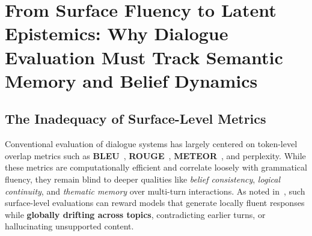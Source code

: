 \documentclass[11pt]{article}
\begin{document}

\section{From Surface Fluency to Latent Epistemics: Why Dialogue Evaluation Must Track Semantic Memory and Belief Dynamics}

\subsection{The Inadequacy of Surface-Level Metrics}

Conventional evaluation of dialogue systems has largely centered on token-level overlap metrics such as \textbf{BLEU}~\cite{papineni2002bleu}, \textbf{ROUGE}~\cite{lin2004rouge}, \textbf{METEOR}~\cite{lavie2007meteor}, and perplexity. While these metrics are computationally efficient and correlate loosely with grammatical fluency, they remain blind to deeper qualities like \emph{belief consistency}, \emph{logical continuity}, and \emph{thematic memory} over multi-turn interactions. As noted in~\cite{liu2016not, mehri2020usr}, such surface-level evaluations can reward models that generate locally fluent responses while \textbf{globally drifting across topics}, contradicting earlier turns, or hallucinating unsupported content.
\end{document}
